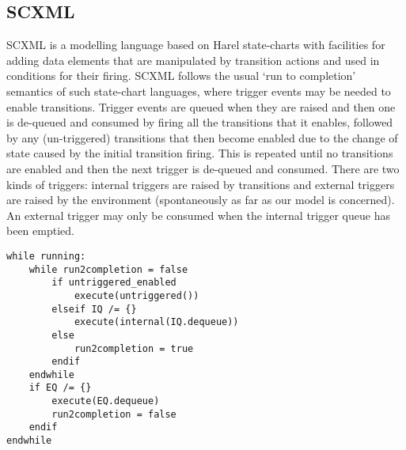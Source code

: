 

\subsection{SCXML}
\label{sec:scxml}

SCXML is a modelling language based on Harel state-charts with facilities for adding data elements that are manipulated by transition actions and used in conditions for their firing. SCXML follows the usual `run to completion' semantics of such state-chart languages, where trigger events may be needed to enable transitions. Trigger events are queued when they are raised and then one is de-queued and consumed by firing all the transitions that it enables, followed by any (un-triggered) transitions that then become enabled due to the change of state caused by the initial transition firing. This is repeated until no transitions are enabled and then the next trigger is de-queued and consumed. There are two kinds of triggers: internal triggers are raised by transitions and external triggers are raised by the environment (spontaneously as far as our model is concerned). An external trigger may only be consumed when the internal trigger queue has been emptied.

\begin{lstlisting}[caption=Pseudocode for 'run to completion',label={lst:scxml-r2c}]
while running:
	while run2completion = false
		if untriggered_enabled
			execute(untriggered())
		elseif IQ /= {}
			execute(internal(IQ.dequeue)) 
		else
			run2completion = true
		endif
	endwhile
	if EQ /= {}
		execute(EQ.dequeue) 
		run2completion = false
	endif
endwhile 
\end{lstlisting}


